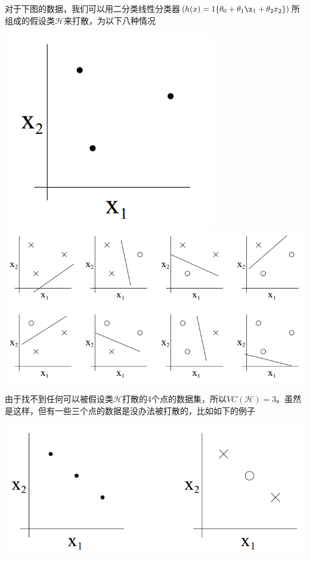 对于下图的数据，我们可以用二分类线性分类器$(h(x)=1\{\theta_0+\theta_1\x_1+\theta_2x_2\})$所组成的假设类$\mathcal{H}$来打散，为以下八种情况
\begin{center}
\includegraphics[scale=0.8]{../figures/LT2.PNG} \\
\includegraphics[scale=1]{../figures/LT3.PNG}
\end{center}
由于找不到任何可以被假设类$\mathcal{H}$打散的4个点的数据集，所以$VC(\mathcal{H})=3$。虽然是这样，但有一些三个点的数据是没办法被打散的，比如如下的例子
\begin{center}
\includegraphics[scale=0.8]{../figures/LT4.PNG}
\end{center}

